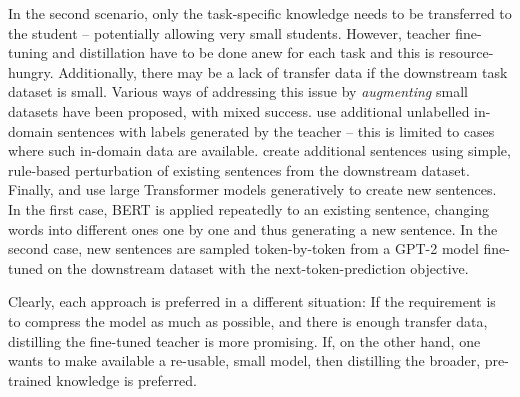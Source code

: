 \documentclass[bsc,frontabs,twoside,singlespacing,parskip,deptreport]{infthesis}
\begin{document}
{{{      %

      In the second scenario, only the task-specific knowledge needs to be transferred to the student -- potentially allowing very small students.
      However, teacher fine-tuning and distillation have to be done anew for each task and this is resource-hungry.
      Additionally, there may be a lack of transfer data if the downstream task dataset is small.
      Various ways of addressing this issue by \textit{augmenting} small datasets have been proposed, with mixed success. 
      \citet{Mukherjee_2019} use additional unlabelled in-domain sentences with labels generated by the teacher -- this is limited to cases where such in-domain data are available. \citet{Tang_2019a} create additional sentences using simple, rule-based perturbation of existing sentences from the downstream dataset. Finally, \citet{Jiao_2019} and \citet{Tang_2019b} use large Transformer models generatively to create new sentences. In the first case, BERT is applied repeatedly to an existing sentence, changing words into different ones one by one and thus generating a new sentence. In the second case, new sentences are sampled token-by-token from a GPT-2 model fine-tuned on the downstream dataset with the next-token-prediction objective.

      Clearly, each approach is preferred in a different situation: If the requirement is to compress the model as much as possible, and there is enough transfer data, distilling the fine-tuned teacher is more promising. If, on the other hand, one wants to make available a re-usable, small model, then distilling the broader, pre-trained knowledge is preferred.
    }
  }
  
}
\end{document}
